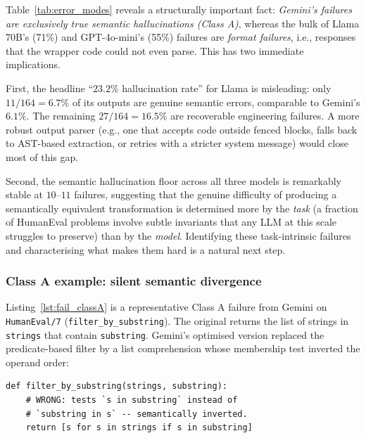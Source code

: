 \documentclass[conference]{IEEEtran}
\begin{document}
Table~\ref{tab:error_modes} reveals a structurally important fact: \emph{Gemini's failures are exclusively true semantic hallucinations (Class A)}, whereas the bulk of Llama 70B's (71\%) and GPT-4o-mini's (55\%) failures are \emph{format failures}, i.e., responses that the wrapper code could not even parse. This has two immediate implications.

First, the headline ``$23.2\%$ hallucination rate'' for Llama is misleading: only $11/164 = 6.7\%$ of its outputs are genuine semantic errors, comparable to Gemini's $6.1\%$. The remaining $27/164 = 16.5\%$ are recoverable engineering failures. A more robust output parser (e.g., one that accepts code outside fenced blocks, falls back to AST-based extraction, or retries with a stricter system message) would close most of this gap.

Second, the semantic hallucination floor across all three models is remarkably stable at $10$--$11$ failures, suggesting that the genuine difficulty of producing a semantically equivalent transformation is determined more by the \emph{task} (a fraction of HumanEval problems involve subtle invariants that any LLM at this scale struggles to preserve) than by the \emph{model}. Identifying these task-intrinsic failures and characterising what makes them hard is a natural next step.

\subsubsection*{Class A example: silent semantic divergence}
Listing~\ref{lst:fail_classA} is a representative Class A failure from Gemini on \texttt{HumanEval/7} (\texttt{filter\_by\_substring}). The original returns the list of strings in \texttt{strings} that contain \texttt{substring}. Gemini's optimised version replaced the predicate-based filter by a list comprehension whose membership test inverted the operand order:

\par\medskip\noindent
\begin{minipage}{\columnwidth}
\begin{lstlisting}[caption={Class A failure: Gemini on HumanEval/7.}, label={lst:fail_classA}]
def filter_by_substring(strings, substring):
    # WRONG: tests `s in substring` instead of
    # `substring in s` -- semantically inverted.
    return [s for s in strings if s in substring]
\end{lstlisting}
\end{minipage}\par\medskip
\end{document}
